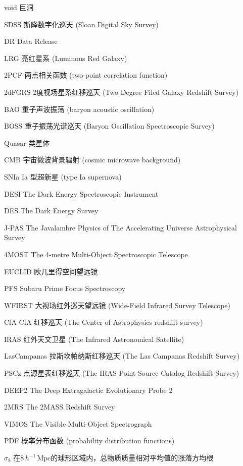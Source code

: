 \begin{denotation}[3cm]
\item[void] 巨洞
\item[SDSS] 斯隆数字化巡天 (Sloan Digital Sky Survey)
\item[DR] Data Release
\item[LRG] 亮红星系 (Luminous Red Galaxy)
\item[2PCF] 两点相关函数 (two-point correlation function)
\item[2dFGRS] 2度视场星系红移巡天 (Two Degree Filed Galaxy Redshift Survey)
\item[BAO] 重子声波振荡 (baryon acoustic oscillation)
\item[BOSS] 重子振荡光谱巡天 (Baryon Oscillation Spectroscopic Survey)
\item[Quasar] 类星体
\item[CMB] 宇宙微波背景辐射 (cosmic microwave background)
\item[SNIa] Ia 型超新星 (type Ia supernova)
\item[DESI]	The Dark Energy Spectroscopic Instrument
\item[DES] The Dark Energy Survey
\item[J-PAS] The Javalambre Physics of The Accelerating Universe Astrophysical Survey
\item[4MOST] The 4-metre Multi-Object Spectroscopic Telescope
\item[EUCLID] 欧几里得空间望远镜
\item[PFS] Subaru Prime Focus Spectroscopy
\item[WFIRST] 大视场红外巡天望远镜 (Wide-Field Infrared Survey Telescope)
\item[CfA] CfA 红移巡天 (The Center of Astrophysics redshift survey)
\item[IRAS] 红外天文卫星 (The Infrared Astronomical Satellite)
\item[LasCampanas] 拉斯坎帕纳斯红移巡天 (The Las Campanas Redshift Survey)
\item[PSCz] 点源星表红移巡天 (The IRAS Point Source Catalog Redshift Survey)
\item[DEEP2] The Deep Extragalactic Evolutionary Probe 2
\item[2MRS] The 2MASS Redshift Survey
\item[VIMOS] The Visible Multi-Object Spectrograph
\item[PDF] 概率分布函数 (probability distribution functions)
\item[$\sigma_8$] 在$8\, h^{-1}\, \mathrm{Mpc}$的球形区域内，总物质质量相对平均值的涨落方均根

\end{denotation}
